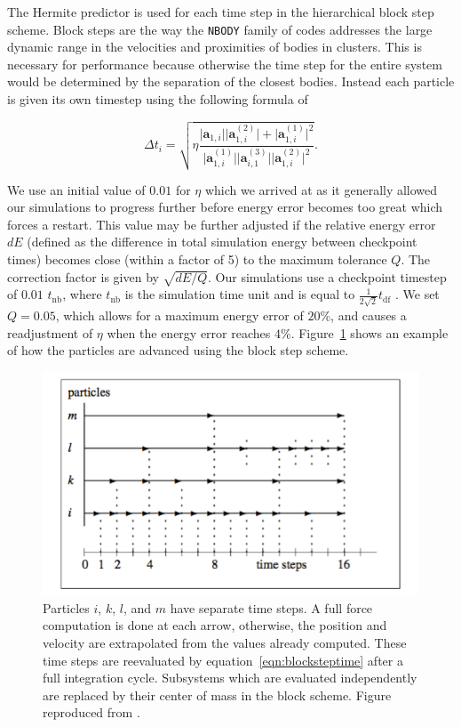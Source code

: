 \documentclass{princeton_astro_thesis}
\numberwithin{equation}{section}
\begin{document}
The Hermite predictor is used for each time step in the hierarchical block step scheme. Block steps are the way the \texttt{NBODY} family of codes addresses the large dynamic range in the velocities and proximities of bodies in clusters. This is necessary for performance because otherwise the time step for the entire system would be determined by the separation of the closest bodies. Instead each particle is given its own timestep using the following formula of \citet{2017Khalisi} 

\begin{equation}
\Delta t_{i} = \sqrt{\eta \frac{\lvert \mathbf{a}_{1,i}\rvert \lvert \mathbf{a}^{(2)}_{1,i}\rvert + \lvert \mathbf{a}^{(1)}_{1,i} \rvert ^2}{\lvert \mathbf{a}^{(1)}_{1,i} \rvert \lvert \mathbf{a}^{(3)}_{i,1} \rvert \lvert \mathbf{a}^{(2)}_{1,i}\rvert^2}}.
\label{eqn:blocksteptime}
\end{equation}

We use an initial value of $0.01$ for $\eta$ which we arrived at as it generally allowed our simulations to progress further before energy error becomes too great which forces a restart.  This value may be further adjusted if the relative energy error $dE$ (defined as the difference in total simulation energy between checkpoint times) becomes close (within a factor of 5) to the maximum tolerance $Q$. The correction factor is given by $\sqrt{dE/Q}$.  Our simulations use a checkpoint timestep of $0.01$ $t_{\mathrm{nb}}$, where $t_{\mathrm{nb}}$ is the simulation time unit and is equal to $\frac{1}{2\sqrt{2}} t_{\mathrm{df}}$ \citep{2017Khalisi}. We set $Q=0.05$, which allows for a maximum energy error of $20\%$, and causes a readjustment of $\eta$ when the energy error reaches $4\%$. Figure~\ref{fig:blockstep} shows an example of how the particles are advanced using the block step scheme. 
\begin{figure}
    \centering
    \includegraphics[width=\textwidth]{KhalisiTimeStep}
    \caption{Particles $i$, $k$, $l$, and $m$ have separate time steps. A full force computation is done at each arrow, otherwise, the position and velocity are extrapolated from the values already computed.  These time steps are reevaluated by equation~\ref{eqn:blocksteptime} after a full integration cycle. Subsystems which are evaluated independently are replaced by their center of mass in the block scheme. Figure reproduced from \citet{2017Khalisi}.}
    \label{fig:blockstep}
\end{figure}
\end{document}
